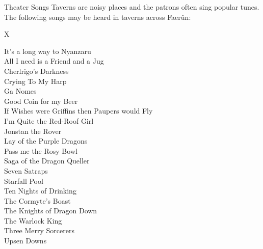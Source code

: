\documentclass[10pt,a4paper,twoside,twocolumn,openany,bg=print,nodeprecatedcode]{dndbook}
\begin{document}
\begin{DndComment}{Theater Songs}
Taverns are noisy places and the patrons often sing popular tunes. The following songs may be heard in taverns across Faerûn:

\begin{DndTable}{X}

It's a long way to Nyanzaru\\
All I need is a Friend and a Jug\\
Cherlrigo's Darkness\\
Crying To My Harp\\
Ga Nomes\\
Good Coin for my Beer\\
If Wishes were Griffins then Paupers would Fly\\
I'm Quite the Red-Roof Girl\\
Jonstan the Rover\\
Lay of the Purple Dragons\\
Pass me the Rosy Bowl\\
Saga of the Dragon Queller\\
Seven Satraps\\
Starfall Pool\\
Ten Nights of Drinking\\
The Cormyte's Boast\\
The Knights of Dragon Down\\
The Warlock King\\
Three Merry Sorcerers\\
Upsen Downs\\
\end{DndTable}


\end{DndComment}
\end{document}
